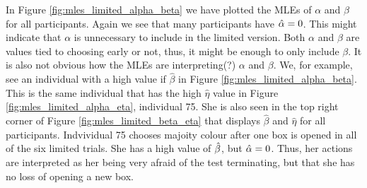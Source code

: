 In Figure \ref{fig:mles_limited_alpha_beta} we have plotted the MLEs of $\alpha$ and $\beta$ for all participants. Again we see that many participants have $\hat{\alpha}=0$. This might indicate that $\alpha$ is unnecessary to include in the limited version. Both $\alpha$ and $\beta$ are values tied to choosing early or not, thus, it might be enough to only include $\beta$. It is also not obvious how the MLEs are interpreting(?) $\alpha$ and $\beta$. We, for example, see an individual with a high value if $\hat{\beta}$ in Figure \ref{fig:mles_limited_alpha_beta}. This is the same individual that has the high $\hat{\eta}$ value in Figure \ref{fig:mles_limited_alpha_eta}, individual 75. She is also seen in the top right corner of Figure \ref{fig:mles_limited_beta_eta} that displays $\hat{\beta}$ and $\hat{\eta}$ for all participants. Indvividual 75 chooses majoity colour after one box is opened in all of the six limited trials. She has a high value of $\hat{\beta}$, but $\hat{\alpha}=0$. Thus, her actions are interpreted as her being very afraid of the test terminating, but that she has no loss of opening a new box.



